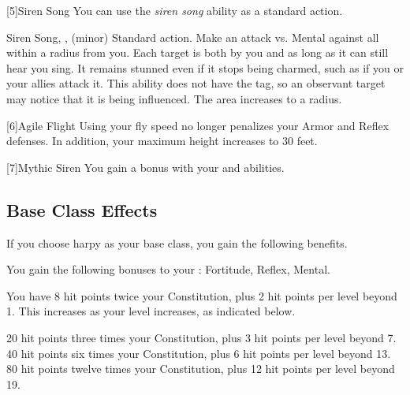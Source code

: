         [5]{Siren Song} You can use the \textit{siren song} ability as a standard action.
        \begin{magicalsustainability}{Siren Song}{, ,  (minor)}
            \abilityusagetime Standard action.
            \rankline
            Make an attack vs. Mental against all  within a \medarea radius from you.
            \hit Each target is both \charmed by you and \stunned as long as it can still hear you sing.
            It remains stunned even if it stops being charmed, such as if you or your allies attack it.
            This ability does not have the  tag, so an observant target may notice that it is being influenced.
            \rankline
             The area increases to a \largearea radius.
        \end{magicalsustainability}

        [6]{Agile Flight} Using your fly speed no longer penalizes your Armor and Reflex defenses.
        In addition, your maximum height increases to 30 feet.

        [7]{Mythic Siren} You gain a   bonus with your  and  abilities.

    \subsection{Base Class Effects}
        If you choose harpy as your base class, you gain the following benefits.

        You gain the following bonuses to your :  Fortitude,  Reflex,  Mental.

            You have 8 hit points \add twice your Constitution, plus 2 hit points per level beyond 1.
            This increases as your level increases, as indicated below.
            \begin{itemize}
                 20 hit points \add three times your Constitution, plus 3 hit points per level beyond 7.
                 40 hit points \add six times your Constitution, plus 6 hit points per level beyond 13.
                 80 hit points \add twelve times your Constitution, plus 12 hit points per level beyond 19.
            \end{itemize}

